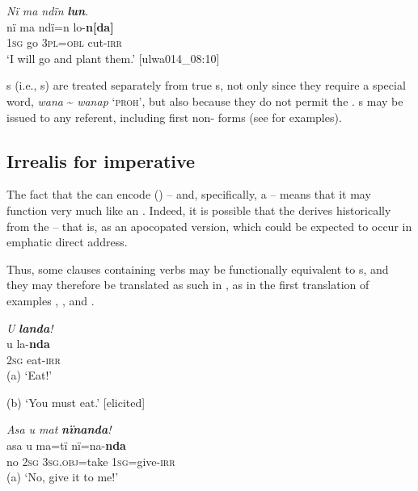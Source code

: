 \ea%
    \label{ex:syntax:85}
          \textit{Nï ma ndïn} \textbf{\textit{lun}}.\\
\gll nï    ma  ndï=n    lo-\textbf{n[da]}\\
    1\textsc{sg}  go  3\textsc{pl=obl}  cut-\textsc{irr}\\
\glt `I will go and plant them.’ [ulwa014\_08:10]
\z

s (i.e., s) are treated separately from true s, not only since they require a special word, \textit{wana} {\textasciitilde} \textit{wanap} ‘\textsc{proh’}, but also because they do not permit the  . s may be issued to any referent, including first  non- forms (see  for examples).


\subsection{Irrealis for imperative}\label{sec:13.2.1}


The fact that the   can encode  () -- and, specifically, a  -- means that it may function very much like an  . Indeed, it is possible that the   derives historically from the   -- that is, as an  apocopated version, which could be expected to occur in emphatic direct address.

  Thus, some clauses containing  verbs may be functionally equivalent to s, and they may therefore be translated as such in , as in the first translation of examples , , and .

\ea%
    \label{ex:syntax:86}
          \textit{U} \textbf{\textit{landa}}\textit{!}\\
\gll    u    la-\textbf{nda}\\
    2\textsc{sg}  eat-\textsc{irr}\\
\glt    (a) ‘Eat!’

    (b) ‘You must eat.’ [elicited]
\z

\ea%
    \label{ex:syntax:87}
          \textit{Asa u mat} \textbf{\textit{nïnanda}}\textit{!}\\
\gll    asa  u    ma=tï      nï=na-\textbf{nda}\\
    no  2\textsc{sg}  3\textsc{sg.obj}=take  \textsc{1sg}=give-\textsc{irr}\\
\glt    (a) ‘No, give it to me!’

